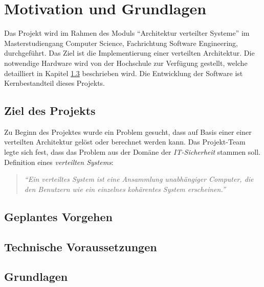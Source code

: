 \chapter{Motivation und Grundlagen}
Das Projekt wird im Rahmen des Moduls \enquote{Architektur verteilter Systeme} im Masterstudiengang Computer Science, Fachrichtung Software Engineering, durchgeführt.  Das Ziel ist die Implementierung einer verteilten Architektur. Die notwendige Hardware wird von der Hochschule zur Verfügung gestellt, welche detailliert in Kapitel \ref{technischeVoraussetzungen} beschrieben wird.
Die Entwicklung der Software ist Kernbestandteil dieses Projekts. 
\section{Ziel des Projekts}
Zu Beginn des Projektes wurde ein Problem gesucht, dass auf Basis einer einer verteilten Architektur gelöst oder berechnet werden kann. Das Projekt-Team legte sich fest, dass das Problem aus der Domäne der \emph{IT-Sicherheit} stammen soll. 
Definition eines \emph{verteilten Systems}:
\begin{quotation}
	\textit{\enquote{Ein verteiltes System ist eine Ansammlung unabhängiger Computer, die den Benutzern wie ein einzelnes kohärentes System erscheinen.}} \citep{tanenbaum}
\end{quotation}


\section{Geplantes Vorgehen}

\section{Technische Voraussetzungen}
\label{technischeVoraussetzungen}

\section{Grundlagen}
\label{grundlagen}




